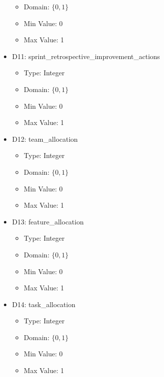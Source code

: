 \documentclass{article}
\begin{document}
\begin{itemize}
\begin{itemize}
            \item Domain: $\{0, 1\}$
            \item Min Value: 0
            \item Max Value: 1
        \end{itemize}
    \item D11: sprint\_retrospective\_improvement\_actions
        \begin{itemize}
            \item Type: Integer
            \item Domain: $\{0, 1\}$
            \item Min Value: 0
            \item Max Value: 1
        \end{itemize}
    \item D12: team\_allocation
        \begin{itemize}
            \item Type: Integer
            \item Domain: $\{0, 1\}$
            \item Min Value: 0
            \item Max Value: 1
        \end{itemize}
    \item D13: feature\_allocation
        \begin{itemize}
            \item Type: Integer
            \item Domain: $\{0, 1\}$
            \item Min Value: 0
            \item Max Value: 1
        \end{itemize}
    \item D14: task\_allocation
        \begin{itemize}
            \item Type: Integer
            \item Domain: $\{0, 1\}$
            \item Min Value: 0
            \item Max Value: 1
        \end{itemize}
\end{itemize}
\end{document}
